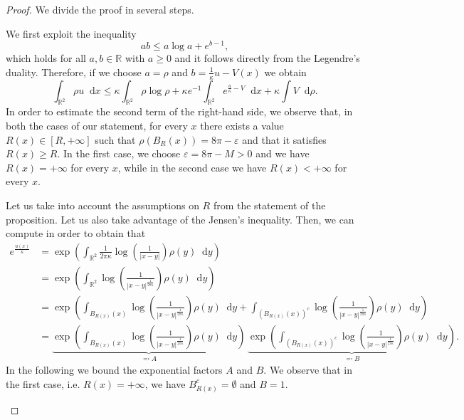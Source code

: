 \documentclass[11pt,a4paper]{article}
\numberwithin{equation}{section}
\newcommand{\R}{{\mathbb{R}}}
\theoremstyle{plain}
\theoremstyle{remark}
\newtheorem{remark}[theorem]{\bf Remark}
\newcommand {\f}{\frac}
\newcommand{\diff}{\mathop{}\!\mathrm{d}}
\newcommand{\step}[1][]{%
  \if\relax\detokenize{#1}\relax
    \def\thisstep{.}%
  \else
    \def\thisstep{: \protect #1.}%
  \fi
  \item}
\newcommand{\ve}{\varepsilon}
\begin{document}

\begin{proof}
We divide the proof in several steps.
\begin{enumeratesteps}
\step[Setting the inequality]
We first exploit the inequality 
$$
ab\le a\log a + e^{b-1}, 
$$
which holds for all $a,b \in \R$ with $a\ge 0$ and it follows directly from the Legendre's duality. Therefore, if we choose $a=\rho$ and $b=\f{1}{\kappa}u-V(x)$ we obtain
\begin{equation}\label{eq:Inequality for entropy}
    \int_{\R^2}\rho u\diff x \le \kappa\int_{\R^2}\rho\log\rho +\kappa e^{-1}\int_{\R^2}e^{\f{u}{\kappa}-V}\diff x+\kappa\int V\diff\rho. 
\end{equation}
In order to estimate the second term of the right-hand side, we observe that, in both the cases of our statement, for every $x$ there exists a value $R(x)\in [R,+\infty]$ such that $\rho(
B_{R}(x))= 8\pi-\varepsilon$ and that it satisfies $R(x)\ge R$. In the first case, we choose $\ve=8\pi-M>0$ and we have $R(x)=+\infty$ for every $x$, while in the second case we have $R(x)<+\infty$ for every $x$.

Let us take into account the assumptions on $R$ from the statement of the proposition. Let us also take advantage of the Jensen's inequality. Then, we can compute in order to obtain that  
\begin{align*}
    e^{\f{u(x)}{\kappa}}&=\exp\left(\int_{\R^2}\f{1}{2\pi\kappa}\log\left(\f{1}{|x-y|}\right)\rho(y)\diff y\right) \\
    & = \exp\left(\int_{\R^2}\log\left(\f{1}{|x-y|^{\f{1}{2\pi\kappa}}}\right)\rho(y)\diff y\right)\\
    & = \exp\left(\int_{B_{R(x)}(x)}\log\left(\f{1}{|x-y|^{\f{1}{2\pi\kappa}}}\right)\rho(y)\diff y+ \int_{(B_{R(x)}(x))^c}\log\left(\f{1}{|x-y|^{\f{1}{2\pi\kappa}}}\right)\rho(y)\diff y\right)\\
    & = \underbrace{\exp\left(\int_{B_{R(x)}(x)}\log\left(\f{1}{|x-y|^{\f{1}{2\pi\kappa}}}\right)\rho(y)\diff y\right)}_{\eqqcolon A} \, \underbrace{\exp\left( \int_{(B_{R(x)}(x))^c}\log\left(\f{1}{|x-y|^{\f{1}{2\pi\kappa}}}\right)\rho(y)\diff y\right)}_{\eqqcolon B}.
\end{align*}
In the following we bound the exponential factors $A$ and $B$. We observe that in the first case, i.e. $R(x) = + \infty$, we have $B_{R(x)}^c=\emptyset$ and $B=1$.


\end{enumeratesteps}
\end{proof}
\end{document}
